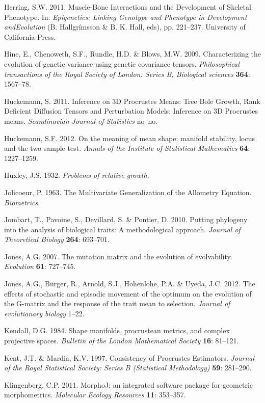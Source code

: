 \documentclass[11pt,twoside]{report}
\begin{document}
Herring, S.W. 2011. Muscle-Bone Interactions and the Development of
Skeletal Phenotype. In: \emph{Epigenetics: Linking Genotype and
Phenotype in Development andEvolution} (B. Hallgrímsson \& B. K. Hall,
eds), pp. 221--237. University of California Press.

Hine, E., Chenoweth, S.F., Rundle, H.D. \& Blows, M.W. 2009.
Characterizing the evolution of genetic variance using genetic
covariance tensors. \emph{Philosophical transactions of the Royal
Society of London. Series B, Biological sciences} \textbf{364}:
1567--78.

Huckemann, S. 2011. Inference on 3D Procrustes Means: Tree Bole Growth,
Rank Deficient Diffusion Tensors and Perturbation Models: Inference on
3D Procrustes means. \emph{Scandinavian Journal of Statistics} no--no.

Huckemann, S.F. 2012. On the meaning of mean shape: manifold stability,
locus and the two sample test. \emph{Annals of the Institute of
Statistical Mathematics} \textbf{64}: 1227--1259.

Huxley, J.S. 1932. \emph{Problems of relative growth}.

Jolicoeur, P. 1963. The Multivariate Generalization of the Allometry
Equation. \emph{Biometrics}.

Jombart, T., Pavoine, S., Devillard, S. \& Pontier, D. 2010. Putting
phylogeny into the analysis of biological traits: A methodological
approach. \emph{Journal of Theoretical Biology} \textbf{264}: 693--701.

Jones, A.G. 2007. The mutation matrix and the evolution of evolvability.
\emph{Evolution} \textbf{61}: 727--745.

Jones, A.G., Bürger, R., Arnold, S.J., Hohenlohe, P.A. \& Uyeda, J.C.
2012. The effects of stochastic and episodic movement of the optimum on
the evolution of the G-matrix and the response of the trait mean to
selection. \emph{Journal of evolutionary biology} 1--22.

Kendall, D.G. 1984. Shape manifolds, procrustean metrics, and complex
projective spaces. \emph{Bulletin of the London Mathematical Society}
\textbf{16}: 81--121.

Kent, J.T. \& Mardia, K.V. 1997. Consistency of Procrustes Estimators.
\emph{Journal of the Royal Statistical Society: Series B (Statistical
Methodology)} \textbf{59}: 281--290.

Klingenberg, C.P. 2011. MorphoJ: an integrated software package for
geometric morphometrics. \emph{Molecular Ecology Resources} \textbf{11}:
353--357.
\end{document}
